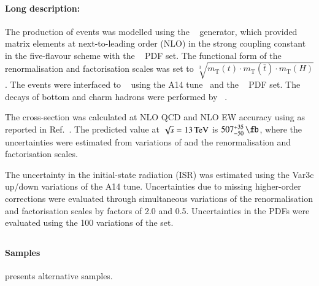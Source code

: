 \paragraph{Long description:}

The production of \ttH events was modelled using the
\POWHEGBOX[v2]~\cite{Frixione:2007nw,Nason:2004rx,Frixione:2007vw,Alioli:2010xd,Hartanto:2015uka}
generator, which provided matrix elements at next-to-leading order (NLO) in the strong coupling
constant \alphas in the five-flavour scheme with the \NNPDF[3.0nlo]~\cite{Ball:2014uwa} PDF set.
The functional form of the renormalisation and factorisation scales was
set to \(\sqrt[3]{m_\text{T}(t)\cdot m_\text{T}(\bar{t}) \cdot m_\text{T}(H)}\).
The events were interfaced to \PYTHIA[8.230]~\cite{Sjostrand:2014zea}
using the A14 tune~\cite{ATL-PHYS-PUB-2014-021} and the
\NNPDF[2.3lo]~\cite{Ball:2014uwa} PDF set. The decays of bottom and charm hadrons
were performed by \EVTGEN[1.6.0]~\cite{Lange:2001uf}.

The cross-section was calculated at NLO QCD and NLO EW accuracy using
\MGNLO as reported in Ref.~\cite{deFlorian:2016spz}.
The predicted value at \(\sqrt{s} = \SI{13}{\ensuremath{\text{TeV}}}\) is
\(507^{+35}_{-50}\,\unit{\fb}\), where the uncertainties were estimated from
variations of \alphas and the renormalisation and factorisation scales.

The uncertainty in the initial-state radiation (ISR) was estimated using the Var3c
up/down variations of the A14 tune. Uncertainties due to missing
higher-order corrections were evaluated through simultaneous variations of the
renormalisation and factorisation scales by factors of
2.0 and 0.5. Uncertainties in the PDFs were evaluated using the 100
variations of the \NNPDF[3.0nlo] set.


\subsection[Powheg+Herwig7]{\POWHER[7]}

\paragraph{Samples}

 presents alternative \ttH samples.

